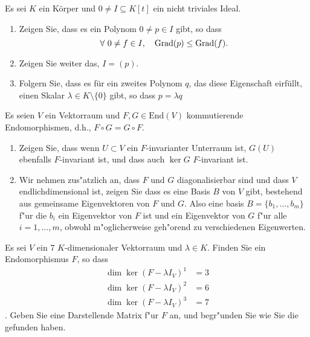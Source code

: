 \documentclass[a4,11pt]{article}
\begin{document}
\vspace*{-17mm}
{
\kopf
}


\begin{aufgabe}[4 Punkte]
Es sei $K$ ein K\"orper und $0 \neq I \subseteq K[t]$ ein nicht triviales Ideal.

\begin{enumerate}
\item Zeigen Sie, dass es ein Polynom $0 \neq p \in I$ gibt, so dass
\[
\forall \ 0 \neq f \in I, \quad \operatorname{Grad} (p) \leq \operatorname{Grad} (f).
\]
\item Zeigen Sie weiter das, $I = (p)$.
\item Folgern Sie, dass es f\"ur ein zweites Polynom $q$, das diese Eigenschaft eirf\"ullt, einen Skalar $\lambda \in K \setminus \{0\}$ gibt, so dass $p = \lambda q$
\end{enumerate}

\end{aufgabe}

\begin{aufgabe}[4 Punkte]

Es seien $V$ ein Vektorraum und $F, G \in \text{End}(V)$ kommutierende Endomorphismen, d.h., $F \circ G = G \circ F$.
\begin{enumerate}
\item
Zeigen Sie, dass wenn $U \subset V$ ein $F$-invarianter Unterraum ist, $G(U)$ ebenfalls $F$-invariant ist, und dass auch $\ker G$  $F$-invariant ist.

\item Wir nehmen zus"atzlich an, dass  $F$ und $G$ diagonalisierbar sind und dass $V$ endlichdimensional ist, zeigen Sie dass es eine Basis $B$ von $V$ gibt, bestehend aus gemeinsame Eigenvektoren von $F$ und $G$. Also eine basis $B = \{ b_1, \dots , b_m\}$ f"ur die $b_i$ ein Eigenvektor von $F$ ist und ein Eigenvektor von $G$ f"ur alle $i = 1, \dots , m$, obwohl m"oglicherweise geh"orend zu verschiedenen Eigenwerten.
\end{enumerate}
\end{aufgabe}


\begin{aufgabe}[4 Punkte]
Es sei $V$ ein $7$ $K$-dimensionaler Vektorraum und $\lambda \in K$. Finden Sie ein Endomorphismus $F$, so dass
\begin{align*}
\dim \ker (F -\lambda I_V)^1 &= 3\\
\dim \ker (F -\lambda I_V)^2 &= 6 \\
\dim \ker (F -\lambda I_V)^3 &= 7
\end{align*}.
Geben Sie eine Darstellende Matrix f"ur $F$ an, und begr"unden Sie wie Sie die gefunden haben.
\end{aufgabe}
\end{document}
